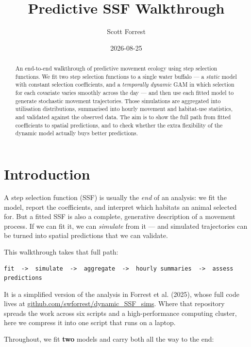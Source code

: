 \documentclass[
  letterpaper,
  DIV=11,
  numbers=noendperiod]{scrartcl}
\title{Predictive SSF Walkthrough}
\author{Scott Forrest}
\date{2026-08-25}
\renewcommand*\contentsname{Table of contents}
\newcommand\contentsname{Table of contents}
\begin{document}
\maketitle
\begin{abstract}
An end-to-end walkthrough of predictive movement ecology using step
selection functions. We fit two step selection functions to a single
water buffalo --- a \emph{static} model with constant selection
coefficients, and a \emph{temporally dynamic} GAM in which selection for
each covariate varies smoothly across the day --- and then use each
fitted model to generate stochastic movement trajectories. Those
simulations are aggregated into utilisation distributions, summarised
into hourly movement and habitat-use statistics, and validated against
the observed data. The aim is to show the full path from fitted
coefficients to spatial predictions, and to check whether the extra
flexibility of the dynamic model actually buys better predictions.
\end{abstract}

\renewcommand*\contentsname{Table of contents}
{
\setcounter{tocdepth}{3}
\tableofcontents
}

\section{Introduction}\label{introduction}

A step selection function (SSF) is usually the \emph{end} of an
analysis: we fit the model, report the coefficients, and interpret which
habitats an animal selected for. But a fitted SSF is also a complete,
generative description of a movement process. If we can fit it, we can
\emph{simulate} from it --- and simulated trajectories can be turned
into spatial predictions that we can validate.

This walkthrough takes that full path:

\begin{verbatim}
fit  ->  simulate  ->  aggregate  ->  hourly summaries  ->  assess predictions
\end{verbatim}

It is a simplified version of the analysis in Forrest et al. (2025),
whose full code lives at
\href{https://github.com/swforrest/dynamic_SSF_sims}{github.com/swforrest/dynamic\_SSF\_sims}.
Where that repository spreads the work across six scripts and a
high-performance computing cluster, here we compress it into one script
that runs on a laptop.

Throughout, we fit \textbf{two} models and carry both all the way to the
end:
\end{document}
